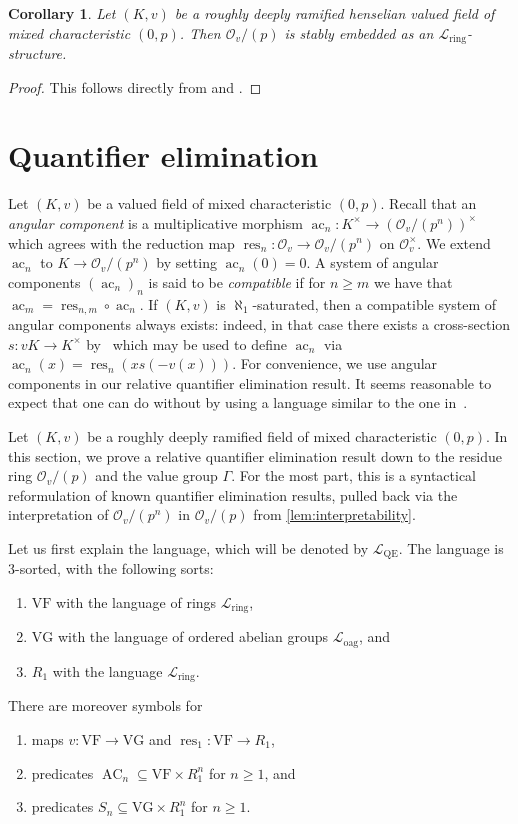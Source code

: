 \documentclass[a4paper]{amsart}
\theoremstyle{mystyle2}
\newtheorem{kor}[thm]{Corollary}
\theoremstyle{mystyle}
\DeclareMathOperator{\res}{res}
\DeclareMathOperator{\ac}{ac}
\DeclareMathOperator{\AC}{AC}
\renewcommand{\L}{\mathcal{L}}
\newcommand{\Lring}{\L_{\mathrm{ring}}}
\newcommand{\Loag}{\L_{\mathrm{oag}}}
\renewcommand{\O}{\mathcal{O}}
\newcommand{\LQE}{\L_\mathrm{QE}}
\newcommand{\VF}{\mathrm{VF}}
\newcommand{\VG}{\mathrm{VG}}
\numberwithin{equation}{section}
\begin{document}
    \begin{kor}\label{kor:SE.ring}
        Let $(K,v)$ be a roughly deeply ramified henselian valued field of mixed characteristic $(0,p)$.
        Then $\O_v/(p)$ is stably embedded as an $\Lring$-structure.
    \end{kor}

    \begin{proof}
        This follows directly from  and .
    \end{proof}

    \section{Quantifier elimination}

    Let $(K, v)$ be a valued field of mixed characteristic $(0,p)$.
    Recall that an \emph{angular component} is a multiplicative morphism $\ac_n\colon K^\times\to (\O_v/(p^n))^\times$ which agrees with the reduction map $\res_n\colon \O_v\to \O_v / (p^n)$ on $\O_v^\times$.
    We extend $\ac_n$ to $K\to \O_v/(p^n)$ by setting $\ac_n(0) = 0$.
    A system of angular components $(\ac_n)_n$ is said to be \emph{compatible} if for $n\geq m$ we have that $\ac_m = \res_{n,m}\circ \ac_n$.
    If $(K,v)$ is $\aleph_1$-saturated, then 
    a compatible system of angular components always exists:
    indeed, in that case there exists a cross-section $s \colon vK\to K^\times$ by~\cite[Corollary 5.5]{vdd} which may be used to define $\ac_n$ via $\ac_n(x) = \res_n(x s(-v(x)))$.
    For convenience, we use angular components in our relative quantifier elimination result. 
    It seems reasonable to expect that one can do without by using a language similar to the one in~\cite{ACGZ22}.

    Let $(K,v)$ be a roughly deeply ramified field of mixed characteristic $(0,p)$.
    In this section, we prove a relative quantifier elimination result down to the residue ring $\O_v/(p)$ and the value group $\Gamma$.
    For the most part, this is a syntactical reformulation of known quantifier elimination results, pulled back via the interpretation of $\O_v/(p^n)$ in $\O_v/(p)$ from \cref{lem:interpretability}.
    
    Let us first explain the language, which will be denoted by $\LQE$.
    The language is $3$-sorted, with the following sorts:
    \begin{enumerate}
        \item $\VF$ with the language of rings $\Lring$, 
        \item $\VG$ with the language of ordered abelian groups $\Loag$, and
        \item $R_1$ with the language $\Lring$.
    \end{enumerate}
    There are moreover symbols for
    \begin{enumerate}
        \item maps $v\colon \VF\to \VG$ and $\res_1\colon \VF\to R_1$,
        \item predicates $\AC_n\subseteq \VF\times R_1^n$ for $n\geq 1$, and
        \item predicates $S_n\subseteq \VG\times R_1^n$ for $n\geq 1$.
    \end{enumerate}
\end{document}
